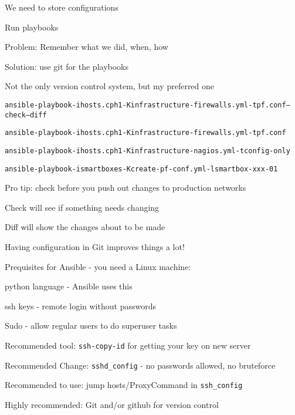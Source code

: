 \documentclass[Screen16to9,17pt]{foils}
\begin{document}


\begin{list2}
\item We need to store configurations
\item Run playbooks
\item Problem: Remember what we did, when, how
\item Solution: use git for the playbooks
\item Not the only version control system, but my preferred one
\end{list2}



\begin{alltt}\footnotesize
ansible-playbook -i hosts.cph1 -K infrastructure-firewalls.yml -t pf.conf --check --diff

ansible-playbook -i hosts.cph1 -K infrastructure-firewalls.yml -t pf.conf

ansible-playbook -i hosts.cph1 -K infrastructure-nagios.yml -t config-only

ansible-playbook -i smartboxes -K create-pf-conf.yml -l smartbox-xxx-01
\end{alltt}

\begin{list2}
\item Pro tip: check before you push out changes to production networks \smiley
\item Check will see if something needs changing
\item Diff will show the changes about to be made
\item Having configuration in Git improves things a lot!
\end{list2}





Prequisites for Ansible - you need a Linux machine:
\begin{list2}
\item python language - Ansible uses this
\item ssh keys - remote login without passwords
\item Sudo - allow regular users to do superuser tasks
\item Recommended tool: \verb+ssh-copy-id+ for getting your key on new server
\item Recommended Change: \verb+sshd_config+ - no passwords allowed, no bruteforce
\item Recommended to use: jump hosts/ProxyCommand in \verb+ssh_config+
\item Highly recommended: Git and/or github for version control
\end{list2}
\end{document}
